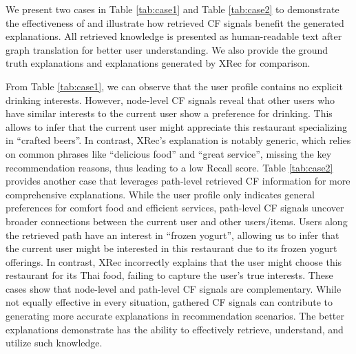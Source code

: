 

We present two cases in Table \ref{tab:case1} and Table \ref{tab:case2} to demonstrate the effectiveness of \model and illustrate how retrieved CF signals benefit the generated explanations. All retrieved knowledge is presented as human-readable text after graph translation for better user understanding. We also provide the ground truth explanations and explanations generated by XRec \cite{ma2024xrec} for comparison.

From Table \ref{tab:case1}, we can observe that the user profile contains no explicit drinking interests. However, node-level CF signals reveal that other users who have similar interests to the current user show a preference for drinking. This allows \model to infer that the current user might appreciate this restaurant specializing in ``crafted beers''. In contrast, XRec's explanation is notably generic, which relies on common phrases like ``delicious food'' and ``great service'', missing the key recommendation reasons, thus leading to a low Recall score. Table \ref{tab:case2} provides another case that leverages path-level retrieved CF information for more comprehensive explanations. While the user profile only indicates general preferences for comfort food and efficient services, path-level CF signals uncover broader connections between the current user and other users/items. Users along the retrieved path have an interest in ``frozen yogurt'', allowing us to infer that the current user might be interested in this restaurant due to its frozen yogurt offerings. In contrast, XRec incorrectly explains that the user might choose this restaurant for its Thai food, failing to capture the user's true interests. These cases show that node-level and path-level CF signals are complementary. While not equally effective in every situation, gathered CF signals can contribute to generating more accurate explanations in recommendation scenarios. The better explanations demonstrate \model has the ability to effectively retrieve, understand, and utilize such knowledge. 
